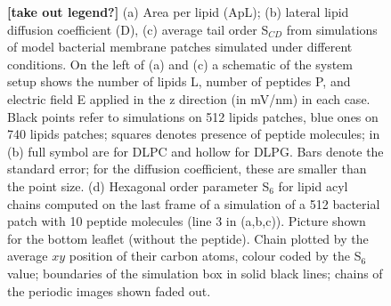 \begin{figure}[p!]
\begin{minipage}{0.39\linewidth}
 \vfill
\end{minipage}
\caption{\textbf{[take out legend?]} (a) Area per lipid (ApL); (b) lateral lipid diffusion coefficient (D), (c) average tail order S$_{CD}$ from simulations of model bacterial membrane patches simulated under different conditions. On the left of (a) and (c) a schematic of the system setup shows the number of lipids L, number of peptides P, and electric field E applied in the z direction (in mV/nm) in each case. Black points refer to simulations on 512 lipids patches, blue ones on 740 lipids patches; squares denotes presence of peptide molecules; in (b) full symbol are for DLPC and hollow for DLPG. Bars denote the standard error; for the diffusion coefficient, these are smaller than the point size. (d) Hexagonal order parameter S$_6$ for lipid acyl chains computed on the last frame of a simulation of a 512 bacterial patch with 10 peptide molecules (line 3 in (a,b,c)). Picture shown for the bottom leaflet (without the peptide). Chain plotted by the average $xy$ position of their carbon atoms, colour coded by the S$_6$ value;  boundaries of the simulation box in solid black lines; chains of the periodic images shown faded out.}
\label{fig:lipids_ApL_D}
\end{figure}
 

